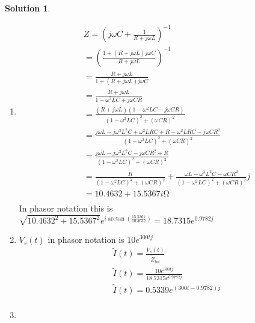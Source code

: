 \documentclass[10pt]{article}
\theoremstyle{definition}
\newtheorem{soln}{Solution}
\begin{document}
\begin{soln}~
  \begin{enumerate}[label=(\alph*)]
    \item \begin{align*}
             & Z=\left(j\omega C+\frac{1}{R+j\omega L}\right)^{-1}                                                                    \\
             & =\left(\frac{1+\left(R+j\omega L\right)j\omega C}{R+j\omega L}\right)^{-1}                                             \\
             & =\frac{R+j\omega L}{1+\left(R+j\omega L\right)j\omega C}                                                               \\
             & =\frac{R+j\omega L}{1-\omega^2 LC+j\omega CR}                                                                          \\
             & =\frac{(R+j\omega L)(1-\omega^2 LC-j\omega CR)}{(1-\omega^2 LC)^2+(\omega CR)^2}                                       \\
             & =\frac{j\omega L-j\omega^3 L^2C+\omega^2 LRC + R-\omega^2 LRC-j\omega CR^2}{(1-\omega^2 LC)^2+(\omega CR)^2}           \\
             & =\frac{j\omega L-j\omega^3 L^2C-j\omega CR^2+ R}{(1-\omega^2 LC)^2+(\omega CR)^2}                                      \\
             & =\frac{R}{(1-\omega^2 LC)^2+(\omega CR)^2}+\frac{\omega L-\omega^3 L^2C-\omega CR^2}{(1-\omega^2 LC)^2+(\omega CR)^2}j \\
             & =10.4632+15.5367i\unit{\ohm}                                                                                           \\
          \end{align*}
          In phasor notation this is $\sqrt{10.4632^2+15.5367^2}e^{i\arctan\left(\frac{15.5367}{10.4632}\right)}=18.7315e^{0.9782j}$
    \item $V_s(t)$ in phasor notation is $10e^{300tj}$
          \begin{align*}
             & \tilde{I}(t)=\frac{V_s(t)}{\tilde{Z}_{tot}}         \\
             & \tilde{I}(t)=\frac{10e^{300tj}}{18.7315e^{0.9782j}} \\
             & \tilde{I}(t)=0.5339e^{(300t-0.9782)j}               \\
          \end{align*}
    \item \begin{align*}

\end{align*}
\end{enumerate}
\end{soln}
\end{document}
